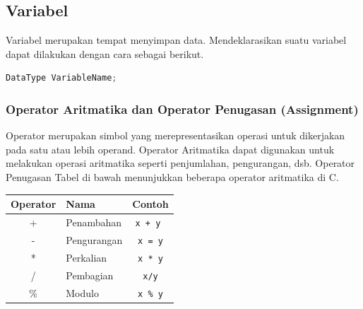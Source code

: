 \subsection{Variabel}
Variabel merupakan tempat menyimpan data. Mendeklarasikan suatu variabel dapat dilakukan dengan cara sebagai berikut.
\begin{lstlisting}[language=c,caption=Deklarasi Variabel C,label=lst:deklarasivariabel,captionpos=t]
DataType VariableName;
\end{lstlisting}
\subsubsection{Operator Aritmatika dan Operator Penugasan (Assignment)}
Operator merupakan simbol yang 
merepresentasikan operasi untuk dikerjakan pada satu atau lebih operand.
Operator Aritmatika dapat digunakan untuk melakukan operasi aritmatika seperti penjumlahan, pengurangan, dsb. Operator Penugasan 
Tabel di bawah menunjukkan beberapa operator aritmatika di C.
\begin{center}
	\begin{tabular}{|c|l|c|}
		\hline
		\multicolumn{1}{|l|}{\textbf{Operator}} & \textbf{Nama} & \multicolumn{1}{l|}{\textbf{Contoh}} \\ \hline
		+                                       & Penambahan    & \verb|x + y |                        \\ \hline
		-                                       & Pengurangan   & \verb|x = y|                         \\ \hline
		*                                       & Perkalian     & \verb|x * y|                         \\ \hline
		/                                       & Pembagian     & \verb|x/y|                           \\ \hline
		\%                                      & Modulo        & \verb|x % y|                         \\ \hline
	\end{tabular}
\end{center}

